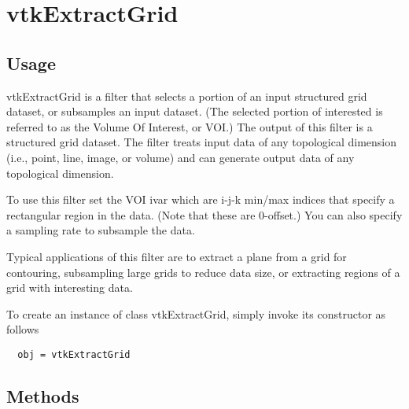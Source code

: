 \section{vtkExtractGrid}

\subsection{Usage}

 vtkExtractGrid is a filter that selects a portion of an input structured
 grid dataset, or subsamples an input dataset. (The selected portion of
 interested is referred to as the Volume Of Interest, or VOI.) The output of
 this filter is a structured grid dataset. The filter treats input data of
 any topological dimension (i.e., point, line, image, or volume) and can
 generate output data of any topological dimension.

 To use this filter set the VOI ivar which are i-j-k min/max indices that
 specify a rectangular region in the data. (Note that these are 0-offset.)
 You can also specify a sampling rate to subsample the data.

 Typical applications of this filter are to extract a plane from a grid for 
 contouring, subsampling large grids to reduce data size, or extracting
 regions of a grid with interesting data.

To create an instance of class vtkExtractGrid, simply
invoke its constructor as follows
\begin{verbatim}
  obj = vtkExtractGrid
\end{verbatim}
\subsection{Methods}


